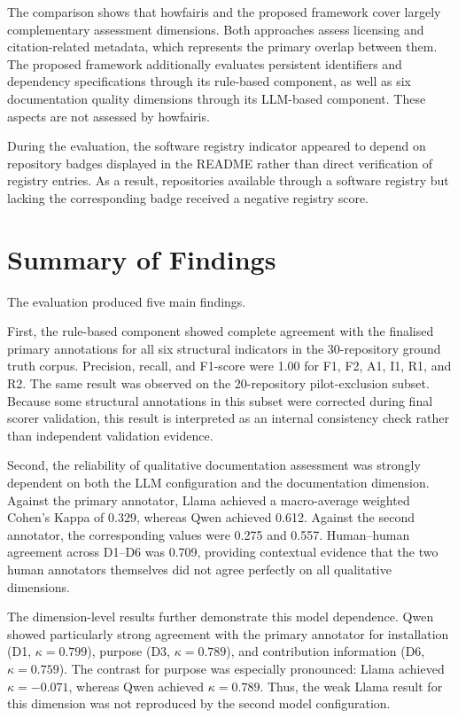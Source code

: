 The comparison shows that howfairis and the proposed framework 
cover largely complementary assessment dimensions. Both approaches 
assess licensing and citation-related metadata, which represents 
the primary overlap between them. The proposed framework 
additionally evaluates persistent identifiers and dependency 
specifications through its rule-based component, as well as six 
documentation quality dimensions through its LLM-based component. 
These aspects are not assessed by howfairis.

During the evaluation, the software registry indicator appeared to 
depend on repository badges displayed in the README rather than 
direct verification of registry entries. As a result, repositories 
available through a software registry but lacking the corresponding 
badge received a negative registry score.

\section{Summary of Findings}

The evaluation produced five main findings.

First, the rule-based component showed complete agreement with the
finalised primary annotations for all six structural indicators in
the 30-repository ground truth corpus. Precision, recall, and F1-score
were 1.00 for F1, F2, A1, I1, R1, and R2. The same result was observed
on the 20-repository pilot-exclusion subset. Because some structural
annotations in this subset were corrected during final scorer
validation, this result is interpreted as an internal consistency
check rather than independent validation evidence.

Second, the reliability of qualitative documentation assessment was
strongly dependent on both the LLM configuration and the documentation
dimension. Against the primary annotator, Llama achieved a
macro-average weighted Cohen's Kappa of 0.329, whereas Qwen achieved
0.612. Against the second annotator, the corresponding values were
0.275 and 0.557. Human--human agreement across D1--D6 was 0.709,
providing contextual evidence that the two human annotators themselves
did not agree perfectly on all qualitative dimensions.

The dimension-level results further demonstrate this model
dependence. Qwen showed particularly strong agreement with the primary
annotator for installation (D1, $\kappa=0.799$), purpose
(D3, $\kappa=0.789$), and contribution information
(D6, $\kappa=0.759$). The contrast for purpose was especially
pronounced: Llama achieved $\kappa=-0.071$, whereas Qwen achieved
$\kappa=0.789$. Thus, the weak Llama result for this dimension was
not reproduced by the second model configuration.

